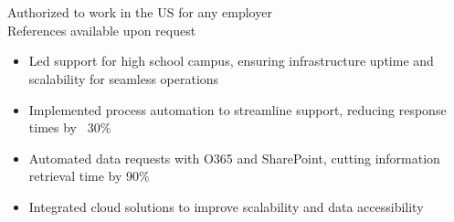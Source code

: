 {\begin{minipage}[t]{13.5cm}
\begin{minipage}[t]{6.5cm}
      \hfill{}\\
      \hfill{}\\
      \hfill{}\\
      \par\medskip
      \hfill{}\\
      \hfill{}\\
      \hfill{}\\
      \hfill{}\\
    \end{minipage}
    \par\bigskip
    \par\bigskip
    \begin{minipage}{13.5cm}
      \begin{center}
        Authorized to work in the US for any employer\\
        References available upon request
      \end{center}
    \end{minipage}
  \end{minipage}
}
\makecvheader

\par\bigskip
{}
\par\smallskip
\begin{minipage}{13.75cm}
  \begin{minipage}{6.5cm}
    \begin{itemize}
      \item Led support for high school campus, ensuring infrastructure uptime and scalability for seamless operations
      \item Implemented process automation to streamline support, reducing response times by ~30\%
    \end{itemize}
  \end{minipage}
  \hfill
  \begin{minipage}{6.5cm}
    \begin{itemize}
      \item Automated data requests with O365 and SharePoint, cutting information retrieval time by 90\%
      \item Integrated cloud solutions to improve scalability and data accessibility
    \end{itemize}
  \end{minipage}
\end{minipage}
\par\smallskip
\divider

